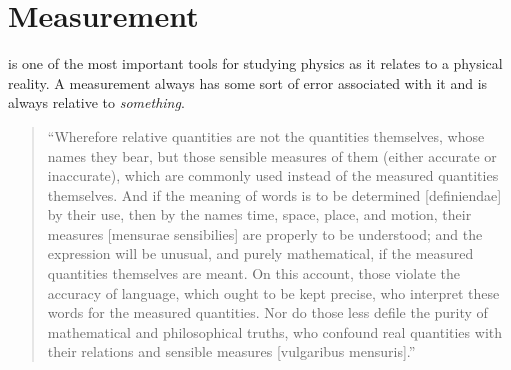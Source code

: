 \section{Measurement}

 is one of the most important tools for studying physics as it relates to a physical reality. A measurement always has some sort of error associated with it and is always relative to \textit{something}.

\begin{quotation}
	``Wherefore relative quantities are not the quantities themselves, whose names they bear, but those sensible measures of them (either accurate or inaccurate), which are commonly used instead of the measured quantities themselves. And if the meaning of words is to be determined [definiendae] by their use, then by the names time, space, place, and motion, their measures [mensurae sensibilies] are properly to be understood; and the expression will be unusual, and purely mathematical, if the measured quantities themselves are meant. On this account, those violate the accuracy of language, which ought to be kept precise, who interpret these words for the measured quantities. Nor do those less defile the purity of mathematical and philosophical truths, who confound real quantities with their relations and sensible measures [vulgaribus mensuris].'' \cite{bib:Newtons Scholium}
\end{quotation}





















